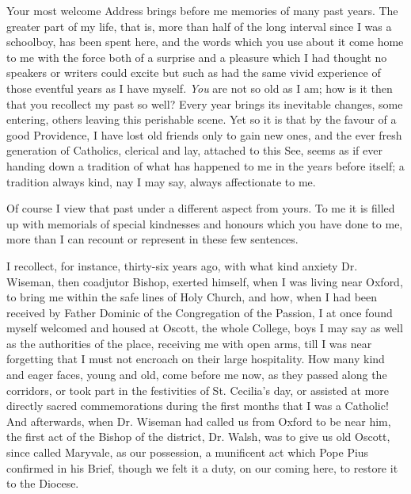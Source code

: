 Your most welcome Address brings before me memories of many past
years. The greater part of my life, that is, more than half of the
long interval since I was a schoolboy, has been spent here, and the
words which you use about it come home to me with the force both of a
surprise and a pleasure which I had thought no speakers or writers
could excite but such as had the same vivid experience of those
eventful years as I have myself. \emph{You} are not so old as I am;
how is it then that you recollect my past so well? Every year brings
its inevitable changes, some entering, others leaving this perishable
scene. Yet so it is that by the favour of a good Providence, I have
lost old friends only to gain new ones, and the ever fresh generation
of Catholics, clerical and lay, attached to this See, seems as if ever
handing down a tradition of what has happened to me in the years
before itself; a tradition always kind, nay I may say, always
affectionate to me.

Of course I view that past under a different aspect from
yours. To me it is filled up with memorials of special kindnesses and
honours which you have done to me, more than I can recount or
represent in these few sentences.

I recollect, for instance, thirty-six years ago, with what kind
anxiety Dr. Wiseman, then coadjutor Bishop, exerted himself, when I
was living near Oxford, to bring me within the safe lines of Holy
Church, and how, when I had been received by Father Dominic of the
Congregation of the Passion, I at once found myself welcomed and
housed at Oscott, the whole College, boys I may say as well as the
authorities of the place, receiving me with open arms, till I was near
forgetting that I must not encroach on their large hospitality. How
many kind and eager faces, young and old, come before me now, as they
passed along the corridors, or took part in the festivities of St.
Cecilia's day, or assisted at more directly sacred commemorations
during the first months that I was a Catholic! And afterwards, when
Dr. Wiseman had called us from Oxford to be near him, the first act of
the Bishop of the district, Dr. Walsh, was to give us old Oscott,
since called Maryvale, as our possession, a munificent act which
Pope Pius confirmed in his Brief, though we felt it a duty, on our
coming here, to restore it to the Diocese.

